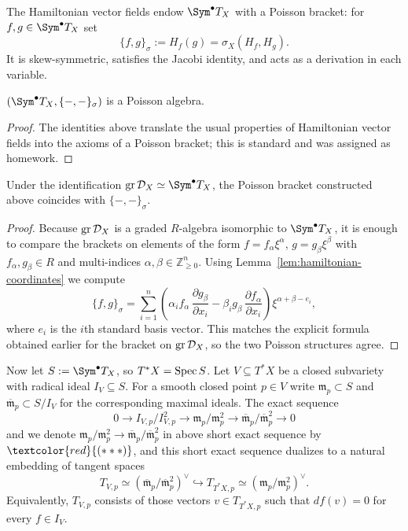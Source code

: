 The Hamiltonian vector fields endow $\Sym^\bullet T_X$ with a Poisson bracket:
for $f,g\in \Sym^\bullet T_X$ set
\[
    \{f,g\}_\sigma := H_f(g)=\sigma_X(H_f,H_g).
\]
It is skew-symmetric, satisfies the Jacobi identity, and acts as a derivation
in each variable.

\begin{lemma}[Lemma~8.3]
    $(\Sym^\bullet T_X,\{-,-\}_\sigma)$ is a Poisson algebra.
\end{lemma}
\begin{proof}
    The identities above translate the usual properties of Hamiltonian vector
    fields into the axioms of a Poisson bracket; this is standard and was assigned
    as homework.
\end{proof}

\begin{lemma}[Lemma~8.4]
    Under the identification $\gr \D_X\simeq \Sym^\bullet T_X$, the Poisson bracket
    constructed above coincides with $\{-,-\}_\sigma$.
\end{lemma}
\begin{proof}
    Because $\operatorname{gr} \mathcal{D}_X$ is a graded $R$-algebra isomorphic to $\Sym^\bullet T_X$, it
    is enough to compare the brackets on elements of the form
    $f=f_\alpha\xi^\alpha$, $g=g_\beta\xi^\beta$ with $f_\alpha,g_\beta\in R$ and
    multi-indices $\alpha,\beta\in\mathbb Z_{\ge0}^n$.  Using
    Lemma~\ref{lem:hamiltonian-coordinates} we compute
    \[
        \{f,g\}_\sigma
        = \sum_{i=1}^n
        \left(
        \alpha_i f_\alpha\,\frac{\partial g_\beta}{\partial x_i}
        -\beta_i g_\beta\,\frac{\partial f_\alpha}{\partial x_i}
        \right)
        \xi^{\alpha+\beta-e_i},
    \]
    where $e_i$ is the $i$th standard basis vector.  This matches the explicit
    formula obtained earlier for the bracket on $\operatorname{gr} \mathcal{D}_X$, so the two Poisson
    structures agree.
\end{proof}

Now let $S:=\Sym^\bullet T_X$, so $T^\ast X=\operatorname{Spec} S$.  Let
$V\subseteq T^\ast X$ be a closed subvariety with radical ideal
$I_V\subseteq S$.  For a smooth closed point $p\in V$ write
$\mathfrak m_p\subset S$ and $\overline{\mathfrak m}_p\subset S/I_V$ for the
corresponding maximal ideals.  The exact sequence
\[
    0 \longrightarrow I_{V,p}/I_{V,p}^2
    \longrightarrow \mathfrak m_p/\mathfrak m_p^2
    \longrightarrow \overline{\mathfrak m}_p/\overline{\mathfrak m}_p^2
    \longrightarrow 0
\]
and we denote $\mathfrak m_p/\mathfrak m_p^2 \longrightarrow \overline{\mathfrak m}_p/\overline{\mathfrak m}_p^2$
in above short exact sequence by \hypertarget{triple_ast}{$\textcolor{red}{(* * *)}$},
and this short exact sequence dualizes to a natural embedding of tangent spaces
\[
    T_{V,p}\simeq (\overline{\mathfrak m}_p/\overline{\mathfrak m}_p^2)^\vee
    \hookrightarrow
    T_{T^\ast X,p}\simeq (\mathfrak m_p/\mathfrak m_p^2)^\vee.
\]
Equivalently, $T_{V,p}$ consists of those vectors $v\in T_{T^\ast X,p}$ such
that $df(v)=0$ for every $f\in I_V$.

